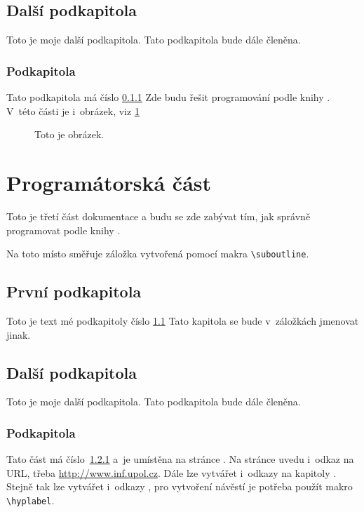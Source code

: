 \documentclass{article}
\begin{document}
\subsection{Další podkapitola}
Toto je moje další podkapitola. Tato podkapitola bude dále členěna.

\subsubsection{Podkapitola}\label{podkapX}
Tato podkapitola má číslo \ref{podkapX} Zde budu řešit programování podle
knihy \cite{kovar}. V~této části je i~obrázek, viz \ref{obr}

\begin{figure}[ht]
  \centerline{}
  \caption{Toto je obrázek.} \label{obr}
\end{figure}


\newpage
\section{Programátorská část}
Toto je třetí část dokumentace a budu se zde zabývat tím, 
jak správně programovat podle knihy \cite{smith}.

\medskip
{}
Na toto místo směřuje záložka vytvořená pomocí makra \verb|\suboutline|.

\subsection{První podkapitola}\label{kapY}
Toto je text mé podkapitoly číslo \ref{kapY}
Tato kapitola se bude v~záložkách jmenovat jinak.

\subsection{Další podkapitola}
Toto je moje další podkapitola. Tato podkapitola bude dále členěna.

\subsubsection{Podkapitola}\label{podkapY}
Tato část má číslo~\ref{podkapY} a~je umístěna na stránce \pageref{podkapY}.
Na stránce uvedu i~odkaz na URL, třeba \url{http://www.inf.upol.cz}.
Dále lze vytvářet i~odkazy na kapitoly .
Stejně tak lze vytvářet i~odkazy ,
pro vytvoření návěstí je potřeba použít makro \verb|\hyplabel|.
\end{document}
